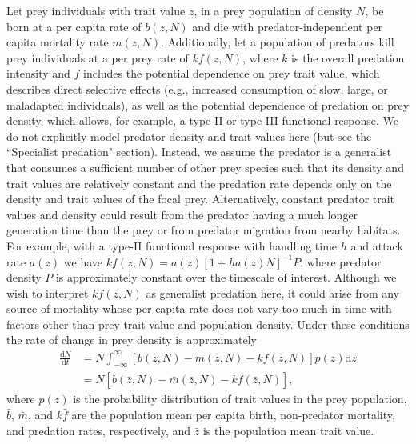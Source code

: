 \documentclass[11pt]{article}
\begin{document}
Let prey individuals with trait value $z$, in a prey population of density $N$, be born at a per capita rate of $b(z,N)$ and die with predator-independent per capita mortality rate $m(z,N)$. 
Additionally, let a population of predators kill prey individuals at a per prey rate of $k f(z,N)$, where $k$ is the overall predation intensity and $f$ includes the potential dependence on prey trait value, which describes direct selective effects (e.g., increased consumption of slow, large, or maladapted individuals), as well as the potential dependence of predation on prey density, which allows, for example, a type-II or type-III functional response.
We do not explicitly model predator density and trait values here (but see the ``Specialist predation" section). 
Instead, we assume the predator is a generalist that consumes a sufficient number of other prey species such that its density and trait values are relatively constant and the predation rate depends only on the density and trait values of the focal prey.
Alternatively, constant predator trait values and density could result from the predator having a much longer generation time than the prey or from predator migration from nearby habitats.
For example, with a type-II functional response with handling time $h$ and attack rate $a(z)$ we have $k f(z,N) = a(z) [1 + h a(z) N]^{-1} P$, where predator density $P$ is approximately constant over the timescale of interest.
Although we wish to interpret $k f(z,N)$ as generalist predation here, it could arise from any source of mortality whose per capita rate does not vary too much in time with factors other than prey trait value and population density.
Under these conditions the rate of change in prey density is approximately
\begin{equation}\label{dPdtGen}
\begin{aligned}
\frac{\mathrm{d}N}{\mathrm{d}t} &= N \int_{-\infty}^{\infty} \left[ b(z,N) - m(z,N) - k f(z,N) \right] p(z) \mathrm{d}z \\
&= N \left[ \bar{b}(\bar{z},N) - \bar{m}(\bar{z},N) - k \bar{f}(\bar{z},N) \right],
\end{aligned}
\end{equation}
where $p(z)$ is the probability distribution of trait values in the prey population, $\bar{b}$, $\bar{m}$, and $k\bar{f}$ are the population mean per capita birth, non-predator mortality, and predation rates, respectively, and $\bar{z}$ is the population mean trait value.
\end{document}
